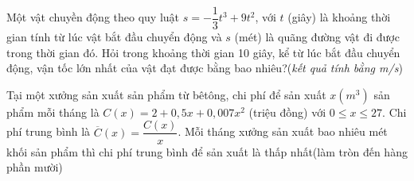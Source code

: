\begin{ex}
	Một vật chuyền động theo quy luật $s=-\dfrac{1}{3} t^3+9 t^2$, với $t$ (giây) là khoảng thời gian tính từ lúc vật bắt đầu chuyển động và $s$ (mét) là quãng đường vật đi được trong thời gian đó. Hỏi trong khoảng thời gian 10 giây, kể từ lúc bắt đầu chuyển động, vận tốc lớn nhất của vật đạt được bằng bao nhiêu?(\textit{kết quả tính bằng m/s})\\
	\loigiai{
		
	}
\end{ex}
\begin{ex}
	Tại một xưởng sản xuất sản phẩm từ bêtông, chi phí để sản xuất ${x} (m^3)$ sản phẩm mỗi tháng là $C(x)=2+0,5x+0,007x^2$ (triệu đồng) với $0\le x \le 27$. Chi phí trung bình là $\overline{C}(x)=\dfrac{C(x)}{x}$. Mỗi tháng xưởng sản xuất bao nhiêu mét khối sản phẩm thì chi phí trung bình để sản xuất là thấp nhất(làm tròn đến hàng phần mười)\\
	
	\end{ex}
